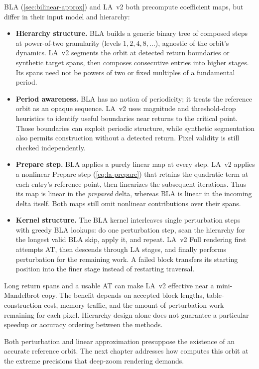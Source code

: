 BLA (\cref{sec:bilinear-approx}) and LA~v2 both precompute coefficient
maps, but differ in their input model and hierarchy:
\begin{itemize}
  \item \textbf{Hierarchy structure.}  BLA builds a generic binary tree
        of composed steps at power-of-two granularity (levels
        \(1, 2, 4, 8, \ldots\)), agnostic of the orbit's dynamics.
        LA~v2 segments the orbit at detected return boundaries or
        synthetic target spans, then composes consecutive entries
        into higher stages. Its spans need not be powers of two or
        fixed multiples of a fundamental period.

  \item \textbf{Period awareness.}  BLA has no notion of periodicity;
        it treats the reference orbit as an opaque sequence.  LA~v2
        uses magnitude and threshold-drop heuristics to identify
        useful boundaries near returns to the critical point. Those
        boundaries can exploit periodic structure, while synthetic
        segmentation also permits construction without a detected
        return. Pixel validity is still checked independently.

  \item \textbf{Prepare step.}  BLA applies a purely linear map at every
        step.  LA~v2 applies a nonlinear Prepare step
        (\cref{eq:la-prepare}) that retains the quadratic term at each
        entry's reference point, then linearizes the subsequent
        iterations. Thus its map is linear in the \emph{prepared}
        delta, whereas BLA is linear in the incoming delta itself.
        Both maps still omit nonlinear contributions over their spans.

  \item \textbf{Kernel structure.}  The BLA kernel interleaves single
        perturbation steps with greedy BLA lookups: do one perturbation
        step, scan the hierarchy for the longest valid BLA skip, apply
        it, and repeat. LA~v2 Full rendering first attempts AT, then
        descends through LA stages, and finally performs perturbation
        for the remaining work. A failed block transfers its starting
        position into the finer stage instead of restarting traversal.
\end{itemize}
Long return spans and a usable AT can make LA~v2 effective near a
mini-Mandelbrot copy. The benefit depends on accepted block lengths,
table-construction cost, memory traffic, and the amount of perturbation
work remaining for each pixel. Hierarchy design alone does not
guarantee a particular speedup or accuracy ordering between the methods.

Both perturbation and linear approximation presuppose the existence of
an accurate reference orbit.  The next chapter addresses how
\FractalShark{} computes this orbit at the extreme precisions that
deep-zoom rendering demands.
